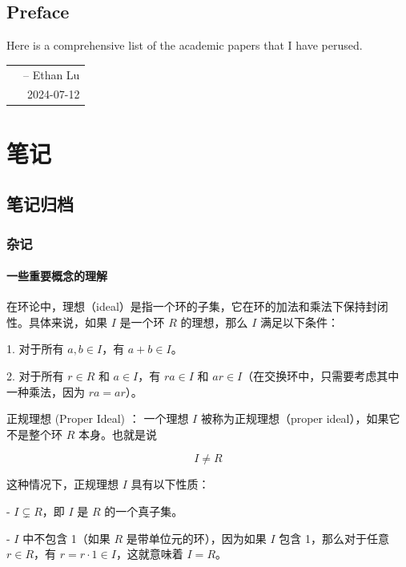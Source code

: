 \documentclass[lang=cn,12pt,fontset=none,a4paper]{beautybook}
\begin{document}
\frontmatter
{}

{%
\thispagestyle{empty}
\chapter*{Preface}
Here is a comprehensive list of the academic papers that I have perused.


\hfill
\begin{tabular}{lr}
    &-- Ethan Lu\\ 
    &2024-07-12
\end{tabular}
\clearpage}

\thispagestyle{empty}
\tableofcontents\let\cleardoublepage\clearpage


\mainmatter
{}

\part{笔记}
\chapter{笔记归档}
\section{杂记}
\subsection{一些重要概念的理解}
   在环论中，理想（ideal）是指一个环的子集，它在环的加法和乘法下保持封闭性。具体来说，如果 $I$ 是一个环 $R$ 的理想，那么 $I$ 满足以下条件：

1. 对于所有 $a, b \in I$，有 $a + b \in I$。

2. 对于所有 $r \in R$ 和 $a \in I$，有 $ra \in I$ 和 $ar \in I$（在交换环中，只需要考虑其中一种乘法，因为 $ra = ar$）。

正规理想 (Proper Ideal) ：
一个理想 $I$ 被称为正规理想（proper ideal），如果它不是整个环 $R$ 本身。也就是说 %

\[ I \neq R \]

这种情况下，正规理想 $I$ 具有以下性质：

- $I \subsetneq R$，即 $I$ 是 $R$ 的一个真子集。

- $I$ 中不包含 1（如果 $R$ 是带单位元的环），因为如果 $I$ 包含 1，那么对于任意 $r \in R$，有 $r = r \cdot 1 \in I$，这就意味着 $I = R$。
\end{document}
